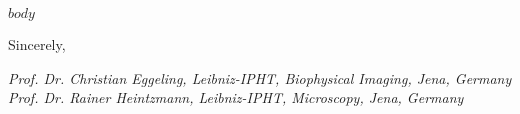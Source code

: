 \documentclass[$size$]{letter}
\newcommand{\header}[9]{
    {\hypersetup{hidelinks}
    \noindent
    \parbox[b][0.625in][t]{6.5in}{
        \vspace{-0.375in}
        \parbox[b][0.625in][t]{3.74in}
            {\href{http://www.umich.edu}
            {\texttt{[image: ./IPHTLogo.pdf]}}}\hfill
        \parbox[b][0.625in][t]{2in}{
            \setlength{\baselineskip}{9pt}
            \fontsize{7pt}{7pt}{
                \fontspec{TeX Gyre Heros}
                #1\\
                #2, #3 #4\\
                Phone: #5\\
                Email: \href{mailto:#6}{#6}
                }
            }
        }}
    }
\begin{document}

\vspace{20pt}

$body$

\begin{minipage}[t]{6.5in}
Sincerely,

\vspace{0.1in}
\textit{Prof. Dr. Christian Eggeling, Leibniz-IPHT, Biophysical Imaging, Jena, Germany}\\
\textit{Prof. Dr. Rainer Heintzmann, Leibniz-IPHT, Microscopy, Jena, Germany}

\end{minipage}
\end{document}
